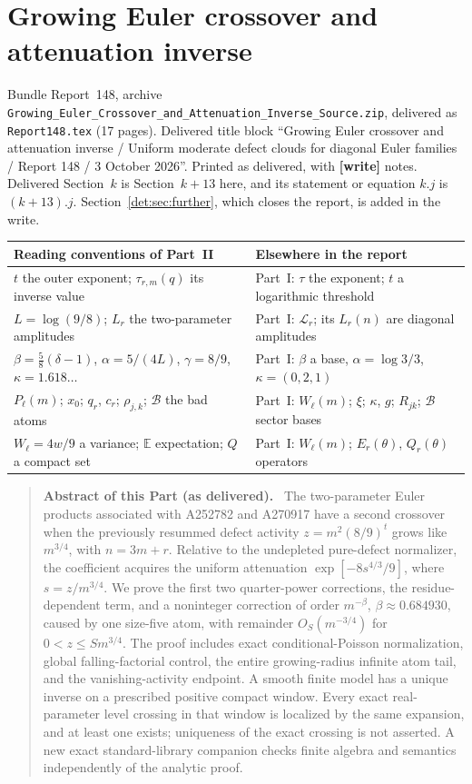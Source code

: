 \documentclass[11pt,letterpaper]{article}
\numberwithin{equation}{section}
\theoremstyle{definition}\newtheorem{definition}[theorem]{Definition}
\theoremstyle{remark}\newtheorem{remark}[theorem]{Remark}
\newcommand{\E}{\mathbb E}
\newcommand{\file}[1]{\nolinkurl{#1}}
\newenvironment{partabstract}{\begin{quote}\small\noindent\textbf{Abstract of this Part (as delivered).}\ }{\end{quote}}
\newcommand{\partsource}[1]{\par\noindent\begin{minipage}{\textwidth}\small #1\end{minipage}\par\medskip}
\begin{document}
\clearpage
\part{Growing Euler crossover and attenuation inverse}\label{det:grow:part}
\partsource{Bundle Report~148, archive \file{Growing_Euler_Crossover_and_Attenuation_Inverse_Source.zip}, delivered as \file{Report148.tex} (17 pages). Delivered title block ``Growing Euler crossover and attenuation inverse / Uniform moderate defect clouds for diagonal Euler families / Report 148 / 3 October 2026''. Printed as delivered, with \textbf{[write]} notes. Delivered Section~$k$ is Section~$k+13$ here, and its statement or equation $k.j$ is $(k+13).j$. Section~\ref{det:sec:further}, which closes the report, is added in the write.}
\begin{center}
\small
\begin{tabular}{@{}>{\raggedright\arraybackslash}p{} >{\raggedright\arraybackslash}p{}@{}}
\toprule
Reading conventions of Part~II & Elsewhere in the report\\
\midrule
$t$ the outer exponent; $\tau_{r,m}(q)$ its inverse value & Part~I: $\tau$ the exponent; $t$ a logarithmic threshold\\
$L=\log(9/8)$; $L_r$ the two-parameter amplitudes & Part~I: $\mathcal L_r$; its $L_r(n)$ are diagonal amplitudes\\
$\beta=\frac58(\delta-1)$, $\alpha=5/(4L)$, $\gamma=8/9$, $\kappa=1.618\ldots$ & Part~I: $\beta$ a base, $\alpha=\log3/3$, $\kappa=(0,2,1)$\\
$P_\ell(m)$; $x_0$; $q_r$, $c_r$; $\rho_{j,k}$; $\mathcal B$ the bad atoms & Part~I: $W_\ell(m)$; $\xi$; $\kappa$, $g$; $R_{jk}$; $\mathcal B$ sector bases\\
$W_\ell=4w/9$ a variance; $\E$ expectation; $Q$ a compact set & Part~I: $W_\ell(m)$; $E_r(\theta)$, $Q_r(\theta)$ operators\\
\bottomrule
\end{tabular}
\end{center}
\begin{partabstract}
The two-parameter Euler products associated with A252782 and A270917
have a second crossover when the previously resummed defect activity
$z=m^2(8/9)^t$ grows like $m^{3/4}$, with $n=3m+r$. Relative to the
undepleted pure-defect normalizer, the coefficient acquires the uniform
attenuation $\exp[-8s^{4/3}/9]$, where $s=z/m^{3/4}$. We prove the first
two quarter-power corrections, the residue-dependent term, and a
noninteger correction of order $m^{-\beta}$, $\beta\approx0.684930$,
caused by one size-five atom, with remainder $O_S(m^{-3/4})$ for
$0<z\le S m^{3/4}$. The proof includes exact conditional-Poisson
normalization, global falling-factorial control, the entire growing-radius
infinite atom tail, and the vanishing-activity endpoint. A smooth finite
model has a unique inverse on a prescribed positive compact window.
Every exact real-parameter level crossing in that window is localized
by the same expansion, and at least one exists; uniqueness of the exact
crossing is not asserted. A new exact standard-library companion checks
finite algebra and semantics independently of the analytic proof.
\end{partabstract}
\end{document}
